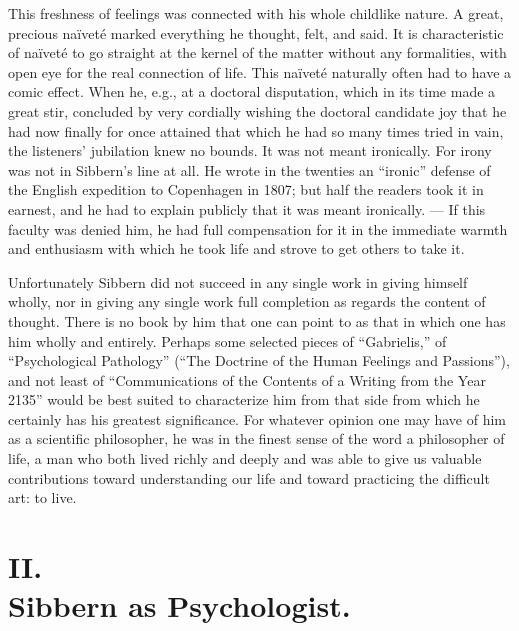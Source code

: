 \documentclass[12pt,a4paper,openany]{book}
\newcommand{\opage}[1]{\marginnote{\footnotesize\textit{[#1]}}}
\begin{document}
This freshness of feelings was connected with his whole
childlike nature. A great, precious naïveté marked everything
he thought, felt, and said. It is characteristic of naïveté
to go straight at the kernel of the matter without any
formalities, with open eye for the real connection of life.
This naïveté naturally often had to have a comic effect. When
he, e.g., at a doctoral disputation, which in its time made
\opage{75}a great stir, concluded by very cordially wishing the doctoral candidate
joy that he had now finally for once attained
that which he had so many times tried in vain,
the listeners' jubilation knew no bounds. It was not meant ironically.
For irony was not in Sibbern's line at all. He wrote in
the twenties an ``ironic'' defense of the English expedition to
Copenhagen in 1807; but half the readers took it in earnest,
and he had to explain publicly that it was meant ironically. ---
If this faculty was denied him, he had full compensation
for it in the immediate warmth and enthusiasm with which he
took life and strove to get others to take it.

Unfortunately Sibbern did not succeed in any single work
in giving himself wholly, nor in giving any single work
full completion as regards the content of thought. There is
no book by him that one can point to as that in which
one has him wholly and entirely. Perhaps some selected pieces
of ``Gabrielis,'' of ``Psychological Pathology'' (``The Doctrine of the
Human Feelings and Passions''), and not least of
``Communications of the Contents of a Writing from the Year 2135'' would
be best suited to characterize him from that side from
which he certainly has his greatest significance. For whatever
opinion one may have of him as a scientific philosopher, he
was in the finest sense of the word a philosopher of life, a man
who both lived richly and deeply and was able to give us
valuable contributions toward understanding our life and toward practicing the
difficult art: to live.

\section*{II.\\  Sibbern as Psychologist.}
\end{document}
